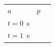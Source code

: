 {\begin{center}
\begin{xtabular*}{\mytablewidth}[t]{|p{10\mystarwidth}|p{10\mystarwidth}|p{10\mystarwidth}|}
        
                  \begin{math}a\end{math}
                 &
    
    
        
                  \begin{math}p\end{math}
     \tabularnewline{}
    
    
        \begin{math}t=0\end{math}~s &
    
    
         &
    
    
     \tabularnewline{}
    
    
        \begin{math}t=1\end{math}~s &
    
    
         &
    

\end{xtabular*}
\end{center}}

